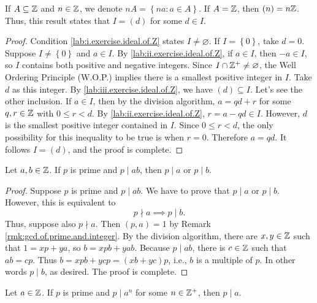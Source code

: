 \documentclass[11pt,a4paper]{article}
\begin{document}
\begin{rem}
    If \(A\subseteq \mathbb{Z}\) and \(n\in \mathbb{Z}\), we denote 
    \(nA = \left\{n a : a\in A \right\}\).
    If \(A=\mathbb{Z}\), then \((n) = n\mathbb{Z}\).
    Thus, this result states that \(I=(d)\) for some \(d\in I\).
\end{rem}

\begin{proof}
    Condition \ref{lab:i.exercise.ideal.of.Z} states \(I\neq \varnothing\).
   If \(I = \left\{ 0 \right\}\), take \(d=0\).
   Suppose \(I\neq \left\{ 0 \right\}\)  and \(a\in I\). 
   By \ref{lab:ii.exercise.ideal.of.Z}, 
   if \(a\in I\), then \(-a\in I\), so \(I\) contains both positive and negative integers.
   Since \(I\cap \mathbb{Z}^+\neq \varnothing\), the Well Ordering Principle (W.O.P.) implies there is a smallest positive integer in \(I\).
    Take \(d\) as this  integer.
    By \ref{lab:iii.exercise.ideal.of.Z}, we have \((d)\subseteq I\).
    Let's see the other inclusion.
    If \(a\in I\), then by the division algorithm, \(a=qd+r\) for some \(q,r\in \mathbb{Z}\) with \(0\leq r < d\).
    By \ref{lab:ii.exercise.ideal.of.Z}, \(r=a-qd\in I\).
    However, \(d\)  is the smallest positive integer contained in \(I\).
    Since \(0\leq r <d\), the only possibility for this inequality to be true is when  \(r=0\).
    Therefore \(a=qd\).
    It follows \(I =  (d)\), and the proof is complete.
\end{proof}


\begin{teo}
    Let \(a,b\in \mathbb{Z}\).
    If \(p\) is prime and \(p\mid ab\), then \(p\mid a\) or \(p\mid b\).
\end{teo}

\begin{proof}
    Suppose \(p\) is prime and \(p\mid ab\). We have to prove that \(p\mid a\) or \(p\mid b\). However, this is equivalent to \[p\nmid a\implies p\mid b.\]
    Thus, suppose also \(p\nmid a\).
    Then \((p,a) = 1\) by Remark \ref{rmk:gcd.of.prime.and.integer}.
    By the division algorithm, there are \(x,y\in\mathbb{Z}\) such that \(1=xp+ya\), so \(b=xpb + yab\).
    Because \(p\mid ab\), there is \(c\in \mathbb{Z}\) such that \(ab=cp\).
    Thus \(b=xpb + ycp = (xb+yc)p\), i.e., \(b\) is a multiple of \(p\).
    In other words \(p\mid b\), as desired. 
    The proof is complete.
\end{proof}

\begin{cor}
    Let \(a\in \mathbb{Z}\).
    If \(p\) is  prime and  \(p\mid a^n\) for some \(n\in\mathbb{Z}^+\), then \(p\mid a\).
\end{cor}
\end{document}
